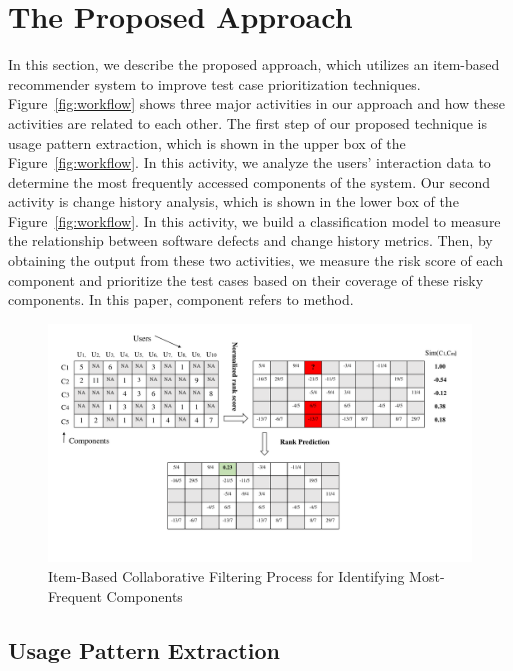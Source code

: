 
\section{The Proposed Approach}
\label{sec:approach}

In this section, we describe the proposed approach, which utilizes
an item-based recommender system to improve test case prioritization techniques. 
Figure~\ref{fig:workflow} shows three major activities in our approach and
how these activities are related to each other. 
The first step of our proposed technique is usage pattern extraction, 
which is shown in the upper box of the Figure~\ref{fig:workflow}. 
In this activity, we analyze the users' interaction data to 
determine the most frequently accessed components of the system. 
Our second activity is change history analysis, which is shown in the
lower box of the Figure~\ref{fig:workflow}. In this activity,  
we build a classification model to 
measure the relationship between software defects and change history metrics. 
Then, by obtaining the output from these two activities, we measure the risk 
score of each component and prioritize the test cases based on their coverage
of these risky components. In this paper, component refers to method. 

\begin{figure}[!hb]
\vspace*{-12pt}
	\centering
	\includegraphics[width=0.8\linewidth]{./collaborative-filtring22.pdf}
\vspace*{-30pt}
	\caption{Item-Based Collaborative Filtering Process for Identifying Most-Frequent Components}
	\label{fig:collaborataivefiltering}
\end{figure} 

\subsection{Usage Pattern Extraction}
\label{recommender-approach}

